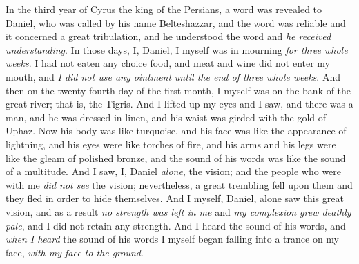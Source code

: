 \begin{biblechapter} %
 In the third year of Cyrus the king of the Persians, a word was revealed to Daniel, who was called by his name Belteshazzar, and the word was reliable and it concerned a great tribulation, and he understood the word and \textit{he received understanding}.
\verse In those days, I, Daniel, I myself was in mourning \textit{for three whole weeks}.
\verse I had not eaten any choice food, and meat and wine did not enter my mouth, and \textit{I did not use any ointment} \textit{until the end of three whole weeks}.
\verse And then on the twenty-fourth day of the first month, I myself was on the bank of the great river; that is, the Tigris.
\verse And I lifted up my eyes and I saw, and there was a man, and he was dressed in linen, and his waist was girded with the gold of Uphaz.
\verse Now his body was like turquoise, and his face was like the appearance of lightning, and his eyes were like torches of fire, and his arms and his legs were like the gleam of polished bronze, and the sound of his words was like the sound of a multitude.
\verse And I saw, I, Daniel \textit{alone}, the vision; and the people who were with me \textit{did not see} the vision; nevertheless, a great trembling fell upon them and they fled in order to hide themselves.
\verse And I myself, Daniel, alone saw this great vision, and as a result \textit{no strength was left in me} and \textit{my complexion grew deathly pale}, and I did not retain any strength.
\verse And I heard the sound of his words, and \textit{when I heard} the sound of his words I myself began falling into a trance on my face, \textit{with my face to the ground}.

\end{biblechapter}
